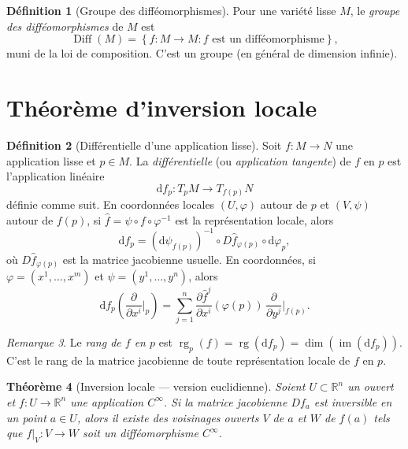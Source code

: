 \documentclass[12pt,a4paper,openany]{book}
\theoremstyle{definition}
\newtheorem{definition}{Définition}[chapter]
\theoremstyle{plain}
\newtheorem{theoreme}[definition]{Théorème}
\theoremstyle{remark}
\newtheorem{remarque}[definition]{Remarque}
\newcommand{\R}{\mathbb{R}}
\DeclareMathOperator{\im}{im}
\DeclareMathOperator{\rg}{rg}
\DeclareMathOperator{\Diff}{Diff}
\newcommand{\dd}{\mathrm{d}}
\newcommand{\set}[1]{\left\{#1\right\}}
\begin{document}
\begin{definition}[Groupe des difféomorphismes]\label{def:Diff-M}
\index{Diff(M)@$\Diff(M)$}
Pour une variété lisse $M$, le \emph{groupe des difféomorphismes} de $M$ est
\[
    \Diff(M) = \set{f \colon M \to M : f \text{ est un difféomorphisme}},
\]
muni de la loi de composition. C'est un groupe (en général de dimension infinie).
\end{definition}


\section{Théorème d'inversion locale}
\label{sec:inversion-locale}

\begin{definition}[Différentielle d'une application lisse]\label{def:differentielle}
Soit $f \colon M \to N$ une application lisse et $p \in M$. La
\emph{différentielle} (ou \emph{application tangente}) de $f$ en $p$ est
l'application linéaire
\[
    \dd f_p \colon T_pM \longrightarrow T_{f(p)}N
\]
définie comme suit. En coordonnées locales $(U, \varphi)$ autour de $p$ et
$(V, \psi)$ autour de $f(p)$, si $\hat{f} = \psi \circ f \circ \varphi^{-1}$
est la représentation locale, alors
\[
    \dd f_p = (\dd \psi_{f(p)})^{-1} \circ D\hat{f}_{\varphi(p)} \circ
    \dd \varphi_p,
\]
où $D\hat{f}_{\varphi(p)}$ est la matrice jacobienne usuelle. En coordonnées,
si $\varphi = (x^1, \ldots, x^m)$ et $\psi = (y^1, \ldots, y^n)$, alors
\[
    \dd f_p\left(\frac{\partial}{\partial x^i}\bigg|_p\right)
    = \sum_{j=1}^{n} \frac{\partial \hat{f}^j}{\partial x^i}(\varphi(p))\,
    \frac{\partial}{\partial y^j}\bigg|_{f(p)}.
\]
\end{definition}

\begin{remarque}\label{rem:rang}
Le \emph{rang de $f$ en $p$} est $\rg_p(f)
= \rg(\dd f_p) = \dim(\im(\dd f_p))$. C'est le rang de la matrice jacobienne
de toute représentation locale de $f$ en $p$.
\end{remarque}

\begin{theoreme}[Inversion locale --- version euclidienne]\label{thm:inversion-locale-Rn}
Soient $U \subset \R^n$ un ouvert et $f \colon U \to \R^n$ une application
$C^\infty$. Si la matrice jacobienne $Df_a$ est inversible en un point $a \in
U$, alors il existe des voisinages ouverts $V$ de $a$ et $W$ de $f(a)$ tels que
$f|_V \colon V \to W$ soit un difféomorphisme $C^\infty$.
\end{theoreme}
\end{document}
